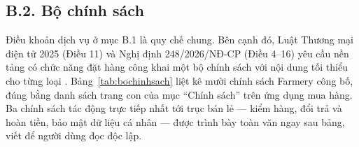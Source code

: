 
\subsection*{B.2. Bộ chính sách}
\label{apdx:chinhsach}

Điều khoản dịch vụ ở mục B.1 là quy chế chung. Bên cạnh đó, Luật Thương mại
điện tử 2025 (Điều 11) và Nghị định 248/2026/NĐ-CP (Điều 4--16) yêu cầu nền
tảng có chức năng đặt hàng công khai một bộ chính sách với nội dung tối thiểu
cho từng loại \parencite{luattmdt2025, nd248_2026}. Bảng~\ref{tab:bochinhsach}
liệt kê mười chính sách Farmery công bố, đúng bằng danh sách trang con của mục
``Chính sách'' trên ứng dụng mua hàng. Ba chính sách tác động trực tiếp nhất
tới trục bán lẻ --- kiểm hàng, đổi trả và hoàn tiền, bảo mật dữ liệu cá nhân
--- được trình bày toàn văn ngay sau bảng, viết để người dùng đọc độc lập.

